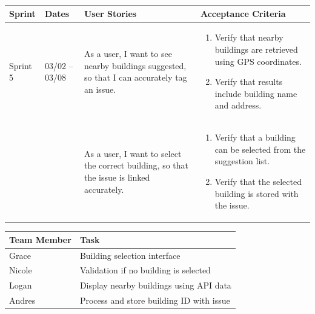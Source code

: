\documentclass[11pt]{article}
\begin{document}
\vspace{2em}


\vspace{0.5em}

\noindent
\begin{tabular}{|L{1.2cm}|L{1.8cm}|L{5.2cm}|L{6.3cm}|}
\hline
\textbf{Sprint} & \textbf{Dates} & \textbf{User Stories} & \textbf{Acceptance Criteria} \\
\hline
Sprint 5 & 03/02 -- 03/08 &
As a user, I want to see nearby buildings suggested, so that I can accurately tag an issue. &
\begin{enumerate}
    \item Verify that nearby buildings are retrieved using GPS coordinates.
    \item Verify that results include building name and address.
\end{enumerate} \\
& &
As a user, I want to select the correct building, so that the issue is linked accurately. &
\begin{enumerate}
    \item Verify that a building can be selected from the suggestion list.
    \item Verify that the selected building is stored with the issue.
\end{enumerate} \\
\hline
\end{tabular}

\vspace{0.5em}

\noindent
\begin{tabular}{|L{2.5cm}|L{12.5cm}|}
\hline
\textbf{Team Member} & \textbf{Task} \\
\hline
Grace & Building selection interface \\
\hline
Nicole & Validation if no building is selected \\
\hline
Logan & Display nearby buildings using API data \\
\hline
Andres & Process and store building ID with issue \\
\hline
\end{tabular}

\vspace{2em}

\end{document}
